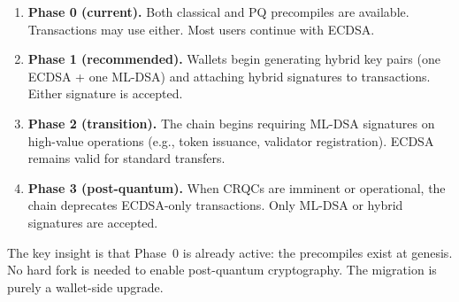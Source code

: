 \begin{enumerate}[nosep]
  \item \textbf{Phase 0 (current).}  Both classical and PQ precompiles
        are available.  Transactions may use either.  Most users
        continue with ECDSA.
  \item \textbf{Phase 1 (recommended).}  Wallets begin generating
        hybrid key pairs (one ECDSA + one ML-DSA) and attaching hybrid
        signatures to transactions.  Either signature is accepted.
  \item \textbf{Phase 2 (transition).}  The chain begins requiring
        ML-DSA signatures on high-value operations (e.g., token
        issuance, validator registration).  ECDSA remains valid for
        standard transfers.
  \item \textbf{Phase 3 (post-quantum).}  When CRQCs are imminent or
        operational, the chain deprecates ECDSA-only transactions.
        Only ML-DSA or hybrid signatures are accepted.
\end{enumerate}

The key insight is that Phase~0 is already active: the precompiles
exist at genesis.  No hard fork is needed to enable post-quantum
cryptography.  The migration is purely a wallet-side upgrade.

